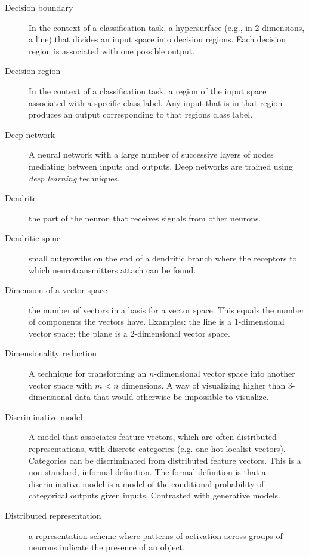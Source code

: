\begin{description}
\item[Decision boundary] In the context of a classification task, a hypersurface (e.g., in 2 dimensions, a line) that divides an input space into decision regions. Each decision region is associated with one possible output.

\item[Decision region] In the context of a classification task, a region of the input space associated with a specific class label. Any input that is in that region produces an output corresponding to that regions class label.

\item[Deep network] A neural network with a large number of successive layers of nodes mediating between inputs and outputs. Deep networks are trained using \emph{deep learning} techniques.

\item[Dendrite] the part of the neuron that receives signals from other neurons.

\item[Dendritic spine] small outgrowths on the end of a dendritic branch where the receptors to which neurotransmitters attach can be found.

\item[Dimension of a vector space] the number of vectors in a basis for a vector space. This equals the number of components the vectors have. Examples: the line is a 1-dimensional vector space; the plane is a 2-dimensional vector space.

\item[Dimensionality reduction] A technique for transforming an $n$-dimensional vector space into another vector space with $m<n$ dimensions. A way of visualizing higher than 3-dimensional data that would otherwise be impossible to visualize.

\item[Discriminative model] A model that associates feature vectors, which are often distributed representations, with discrete categories (e.g. one-hot localist vectors).  Categories can be discriminated from distributed feature vectors. This is a non-standard, informal definition. The formal definition is that a discriminative model is a model of the conditional probability of categorical outputs given inputs. Contrasted with generative models.

\item[Distributed representation] a representation scheme where patterns of activation across groups of neurons indicate the presence of an object. 


\end{description}
